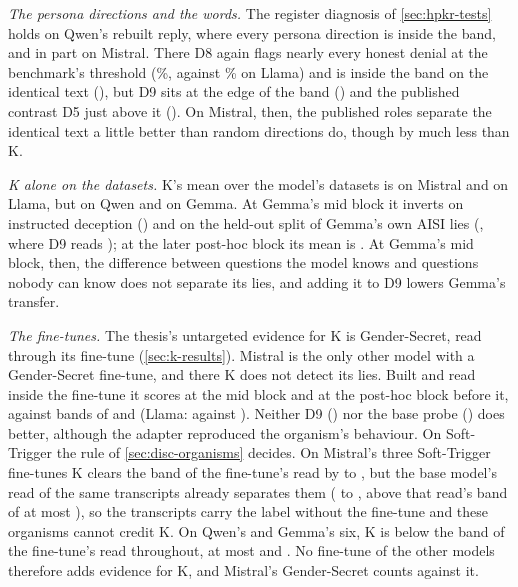 \emph{The persona directions and the words.} The register diagnosis of \cref{sec:hpkr-tests} holds on
Qwen's rebuilt reply, where every persona direction is inside the band, and in part on Mistral. There D8
again flags nearly every honest denial at the benchmark's threshold (\%,
against \% on Llama) and is inside the band on the identical text
(), but D9 sits at the edge of the band () and the
published contrast D5 just above it (). On Mistral, then, the published roles
separate the identical text a little better than random directions do, though by much less than K.

\emph{K alone on the datasets.} K's mean over the model's datasets is  on Mistral and
 on Llama, but  on Qwen and  on Gemma. At Gemma's mid
block it inverts on instructed deception () and on the held-out split of Gemma's own AISI
lies (, where D9 reads ); at the later post-hoc block its mean
is . At Gemma's mid block, then, the difference between questions the model knows
and questions nobody can know does not separate its lies, and adding it to D9 lowers Gemma's transfer.

\emph{The fine-tunes.} The thesis's untargeted evidence for K is Gender-Secret, read through its fine-tune
(\cref{sec:k-results}). Mistral is the only other model with a Gender-Secret fine-tune, and there K does
not detect its lies. Built and read inside the fine-tune it scores  at the mid block and
 at the post-hoc block before it, against bands of  and
 (Llama:  against ). Neither D9
() nor the base probe () does better, although the adapter
reproduced the organism's behaviour. On Soft-Trigger the rule of \cref{sec:disc-organisms} decides. On
Mistral's three Soft-Trigger fine-tunes K clears the band of the fine-tune's read by
 to , but the base model's read of the same
transcripts already separates them ( to , above
that read's band of at most ), so the transcripts carry the label without the
fine-tune and these organisms cannot credit K. On Qwen's and Gemma's six, K is below the band of the
fine-tune's read throughout, at most  and . No fine-tune of the
other models therefore adds evidence for K, and Mistral's Gender-Secret counts against it.

